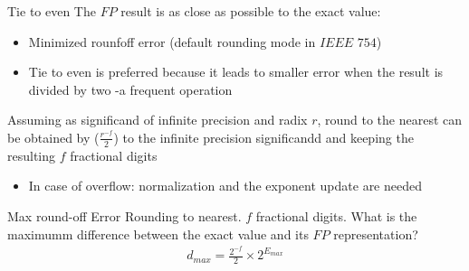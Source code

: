 \begin{parag}{Tie to even}
    The $FP$ result is as close as possible to the exact value:
    \begin{itemize}
        \item Minimized rounfoff error (default rounding mode in $IEEE$ $754$)
        \item Tie to even is preferred because it leads to smaller error when the result is divided by two -a frequent operation
    \end{itemize}
    Assuming as significand of infinite precision and radix $r$, round to the nearest can be obtained by  ($ \frac{r^{-f}}{2}$) to the infinite precision significandd and keeping the resulting $f$ fractional digits
    \begin{itemize}
        \item In case of overflow: normalization and the exponent update are needed
    \end{itemize}

\end{parag}

\begin{parag}{Max round-off Error}
    Rounding to nearest. $f$ fractional digits. What is the maximumm difference between the exact value and its $FP$ representation?
    \\
    \begin{align*}
        d_{max} = \frac{2^{-f}}{2} \times 2^{E_{max}}
    \end{align*}
    

\end{parag}







